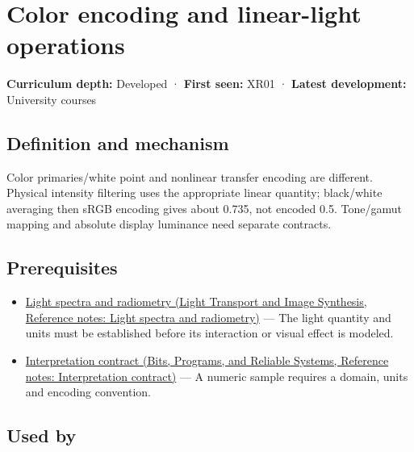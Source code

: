 \hypertarget{appendix-a9f83ad40792}{}\label{referencestart:appendix-a9f83ad40792}
\section{Color encoding and linear-light operations}\label{appendix-a9f83ad40792-color-encoding-and-linear-light-operations}

\textbf{Curriculum depth:} Developed · \textbf{First seen:} XR01 · \textbf{Latest development:} University courses

\begin{allmightroledefinition}

\subsection{Definition and mechanism}\label{appendix-a9f83ad40792-definition-and-mechanism}

Color primaries/white point and nonlinear transfer encoding are different. Physical intensity filtering uses the appropriate linear quantity; black/white averaging then sRGB encoding gives about 0.735, not encoded 0.5. Tone/gamut mapping and absolute display luminance need separate contracts.

\end{allmightroledefinition}

\subsection{Prerequisites}\label{appendix-a9f83ad40792-prerequisites}

\begin{itemize}
\tightlist
\item
  \href{../04-Light-Transport-and-Image-Synthesis/main.pdf\#nameddest=appendix-215c2570199b}{Light spectra and radiometry (Light Transport and Image Synthesis, Reference notes: Light spectra and radiometry)} --- The light quantity and units must be established before its interaction or visual effect is modeled.
\item
  \href{../01-Bits-Programs-and-Reliable-Systems/main.pdf\#nameddest=appendix-f414bd4ed05c}{Interpretation contract (Bits, Programs, and Reliable Systems, Reference notes: Interpretation contract)} --- A numeric sample requires a domain, units and encoding convention.
\end{itemize}

\subsection{Used by}\label{appendix-a9f83ad40792-used-by}

